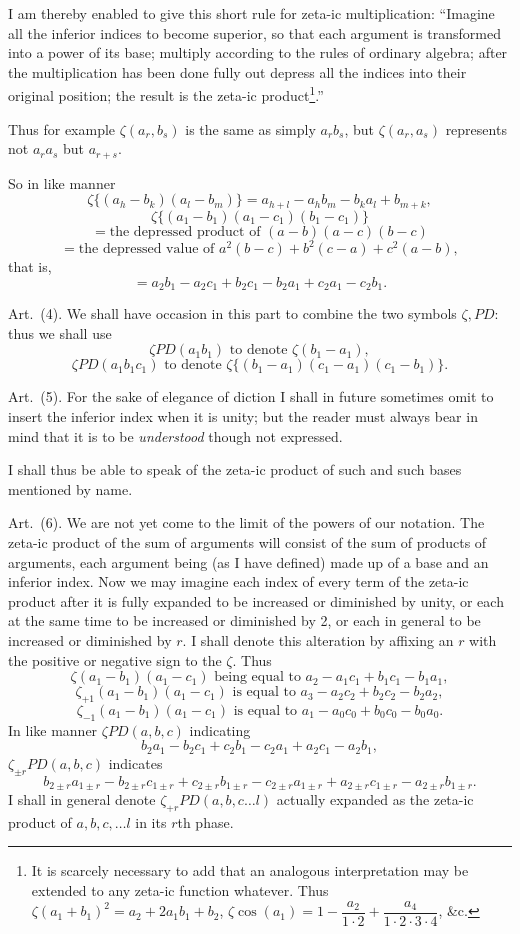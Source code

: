 \documentclass[11pt]{article}
\newcommand{\sourcepage}[1]{\marginpar{\scriptsize p.~#1}}
\newcommand{\art}[1]{\par\smallskip\noindent Art.~(#1).\quad}
\newcommand{\PD}{\mathit{PD}}
\begin{document}
I am thereby enabled to give this short rule for zeta-ic multiplication: ``Imagine all the inferior indices to become superior, so that each argument is transformed into a power of its base; multiply according to the rules of ordinary algebra; after the multiplication has been done fully out depress all the indices into their original position; the result is the zeta-ic product\footnote{It is scarcely necessary to add that an analogous interpretation may be extended to any zeta-ic function whatever. Thus \(\zeta(a_1+b_1)^2=a_2+2a_1b_1+b_2\), \(\zeta\cos(a_1)=1-\dfrac{a_2}{1\cdot2}+\dfrac{a_4}{1\cdot2\cdot3\cdot4}\), \&c.}.''

\sourcepage{48}
Thus for example $\zeta(a_r,b_s)$ is the same as simply $a_rb_s$, but $\zeta(a_r,a_s)$ represents not $a_ra_s$ but $a_{r+s}$.

So in like manner
\[
 \zeta\{(a_h-b_k)(a_l-b_m)\}=a_{h+l}-a_hb_m-b_ka_l+b_{m+k},
\]
\[
 \zeta\{(a_1-b_1)(a_1-c_1)(b_1-c_1)\}
\]
\[
 =\text{the depressed product of }(a-b)(a-c)(b-c)
\]
\[
 =\text{the depressed value of }a^2(b-c)+b^2(c-a)+c^2(a-b),
\]
that is,
\[
 =a_2b_1-a_2c_1+b_2c_1-b_2a_1+c_2a_1-c_2b_1.
\]

\art{4} We shall have occasion in this part to combine the two symbols $\zeta,\PD$: thus we shall use
\[
 \zeta\PD(a_1b_1) \text{ to denote } \zeta(b_1-a_1),
\]
\[
 \zeta\PD(a_1b_1c_1) \text{ to denote } \zeta\{(b_1-a_1)(c_1-a_1)(c_1-b_1)\}.
\]

\art{5} For the sake of elegance of diction I shall in future sometimes omit to insert the inferior index when it is unity; but the reader must always bear in mind that it is to be \emph{understood} though not expressed.

I shall thus be able to speak of the zeta-ic product of such and such bases mentioned by name.

\art{6} We are not yet come to the limit of the powers of our notation. The zeta-ic product of the sum of arguments will consist of the sum of products of arguments, each argument being (as I have defined) made up of a base and an inferior index. Now we may imagine each index of every term of the zeta-ic product after it is fully expanded to be increased or diminished by unity, or each at the same time to be increased or diminished by 2, or each in general to be increased or diminished by $r$. I shall denote this alteration by affixing an $r$ with the positive or negative sign to the $\zeta$. Thus
\[
 \zeta(a_1-b_1)(a_1-c_1)\text{ being equal to }a_2-a_1c_1+b_1c_1-b_1a_1,
\]
\[
 \zeta_{+1}(a_1-b_1)(a_1-c_1)\text{ is equal to }a_3-a_2c_2+b_2c_2-b_2a_2,
\]
\[
 \zeta_{-1}(a_1-b_1)(a_1-c_1)\text{ is equal to }a_1-a_0c_0+b_0c_0-b_0a_0.
\]
In like manner $\zeta\PD(a,b,c)$ indicating
\[
 b_2a_1-b_2c_1+c_2b_1-c_2a_1+a_2c_1-a_2b_1,
\]
$\zeta_{\pm r}\PD(a,b,c)$ indicates
\[
 b_{2\pm r}a_{1\pm r}-b_{2\pm r}c_{1\pm r}+c_{2\pm r}b_{1\pm r}-c_{2\pm r}a_{1\pm r}+a_{2\pm r}c_{1\pm r}-a_{2\pm r}b_{1\pm r}.
\]
I shall in general denote $\zeta_{+r}\PD(a,b,c\ldots l)$ actually expanded as the zeta-ic product of $a,b,c,\ldots l$ in its $r$th phase.
\end{document}
